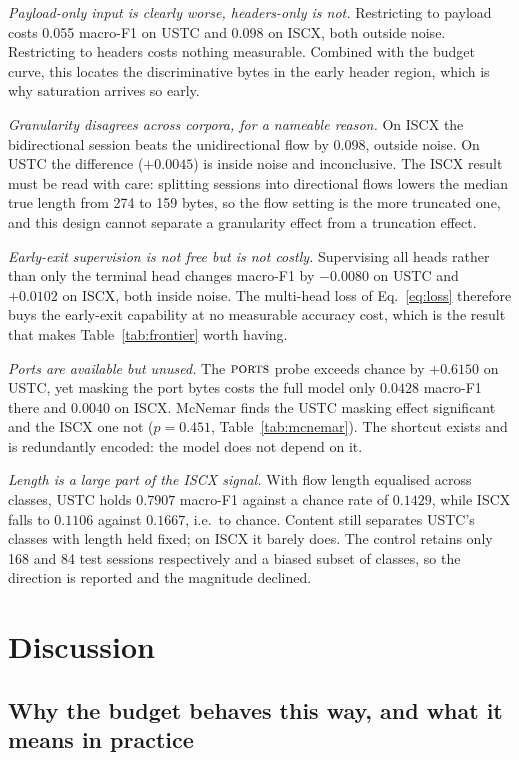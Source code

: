 \documentclass[pdflatex,sn-mathphys-num]{sn-jnl}
\theoremstyle{thmstyleone}%
\theoremstyle{thmstylethree}%
\begin{document}
\emph{Payload-only input is clearly worse, headers-only is not.} Restricting
to payload costs 0.055 macro-F1 on USTC and 0.098 on ISCX, both outside noise.
Restricting to headers costs nothing measurable. Combined with the budget
curve, this locates the discriminative bytes in the early header region, which
is why saturation arrives so early.

\emph{Granularity disagrees across corpora, for a nameable reason.} On
ISCX the bidirectional session beats the unidirectional flow by 0.098, outside
noise. On USTC the difference ($+0.0045$) is inside noise and inconclusive. The
ISCX result must be read with care: splitting sessions into directional flows
lowers the median true length from 274 to 159 bytes, so the flow setting is the
more truncated one, and this design cannot separate a granularity effect from a
truncation effect.

\emph{Early-exit supervision is not free but is not costly.} Supervising all
heads rather than only the terminal head changes macro-F1 by $-0.0080$ on USTC
and $+0.0102$ on ISCX, both inside noise. The multi-head loss of
Eq.~\eqref{eq:loss} therefore buys the early-exit capability at no measurable
accuracy cost, which is the result that makes Table~\ref{tab:frontier}
worth having.

\emph{Ports are available but unused.} The $\textsc{ports}$ probe exceeds
chance by $+0.6150$ on USTC, yet masking the port bytes costs the full model
only $0.0428$ macro-F1 there and $0.0040$ on ISCX. McNemar finds the USTC
masking effect significant and the ISCX one not ($p = 0.451$,
Table~\ref{tab:mcnemar}). The shortcut exists and is redundantly encoded: the
model does not depend on it.

\emph{Length is a large part of the ISCX signal.} With flow length equalised
across classes, USTC holds $0.7907$ macro-F1 against a chance rate of $0.1429$,
while ISCX falls to $0.1106$ against $0.1667$, i.e.\ to chance. Content still
separates USTC's classes with length held fixed; on ISCX it barely does. The
control retains only 168 and 84 test sessions respectively and a biased subset
of classes, so the direction is reported and the magnitude declined.

\section{Discussion}\label{sec:discussion}

\subsection{Why the budget behaves this way, and what it means in practice}
\end{document}
